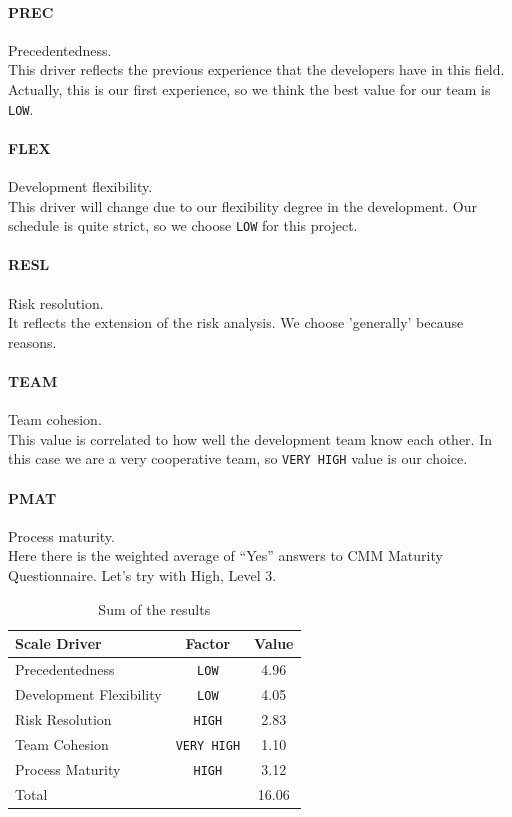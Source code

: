 \paragraph{PREC} Precedentedness. \\  %
This driver reflects the previous experience that the developers have in this 
field. Actually, this is our first experience, so we think the best value for
our team is \texttt{LOW}.

\paragraph{FLEX} Development flexibility. \\
This driver will change due to our flexibility degree in the development.
Our schedule is quite strict, so we choose \texttt{LOW} for this project.

\paragraph{RESL} Risk resolution. \\
It reflects the extension of the risk analysis. We choose 'generally'
because reasons. %

\paragraph{TEAM} Team cohesion. \\
This value is correlated to how well the development team know each other. 
In this case we are a very cooperative team, so \texttt{VERY HIGH} value is
our choice.

\paragraph{PMAT} Process maturity. \\
Here there is the weighted average of ``Yes'' answers to CMM Maturity Questionnaire.
Let's try with High, Level 3. %

\begin{table}[h!]
    \centering
\begin{tabular}{ p{5cm} | c | c }
    Scale Driver            & Factor             &  Value   \\ \hline
    Precedentedness         & \texttt{LOW}       &  4.96    \\
    Development Flexibility & \texttt{LOW}       &  4.05    \\
    Risk Resolution         & \texttt{HIGH}      &  2.83    \\
    Team Cohesion           & \texttt{VERY HIGH} &  1.10    \\
    Process Maturity        & \texttt{HIGH}      &  3.12    \\ \hline
    Total                   &                    & 16.06  
\end{tabular}
    \caption{Sum of the results}
    \label{tab:cocomo1}
\end{table}

